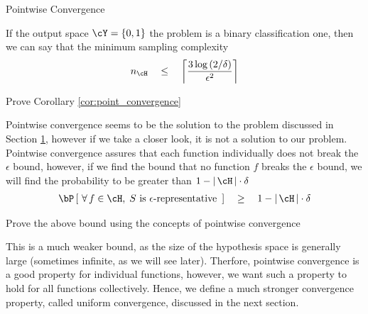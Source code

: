 \documentclass[11pt,a4paper]{article}
\begin{document}
\begin{ssection}[2]{Pointwise Convergence}
	\begin{corollary}
		If the output space $\cY = \set{0, 1}$ \ie the problem is a binary classification one, then we can say that the minimum sampling complexity
		\begin{align*}
			n_\cH	\qle	\ceil{\frac{3 \log{2 / \delta}}{\epsilon^2}}
		\end{align*}
	\end{corollary}

	\begin{exercise}
		Prove Corollary \ref{cor:point_convergence}
	\end{exercise}

	Pointwise convergence seems to be the solution to the problem discussed in Section \hyperlink{sec:1}{1}, however if we take a closer look, it is not a solution to our problem. Pointwise convergence assures that each function individually does not break the $\epsilon$ bound, however, if we find the bound that no function $f$ breaks the $\epsilon$ bound, we will find the probability to be greater than $1 - \abs{\cH} \cdot \delta$ \, \ie
	\begin{align*}
		\prob{\qforall f \in \cH, \; S \qmt{is} \epsilon\mt{-representative}}	\qge	1 - \abs{\cH} \cdot \delta
	\end{align*}

	\begin{exercise}
		Prove the above bound using the concepts of pointwise convergence
	\end{exercise}

	This is a much weaker bound, as the size of the hypothesis space is generally large (sometimes infinite, as we will see later). Therfore, pointwise convergence is a good property for individual functions, however, we want such a property to hold for all functions collectively. Hence, we define a much stronger convergence property, called uniform convergence, discussed in the next section.

\end{ssection}
\end{document}
